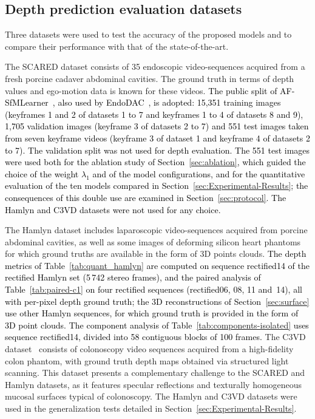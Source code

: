 \documentclass[a4paper,fleqn]{cas-dc}
\begin{document}
{\subsection{Depth prediction evaluation datasets}
Three datasets were used to test the accuracy of the proposed models and to compare their performance with that of the state-of-the-art. 

The SCARED dataset consists of 35 endoscopic video-sequences acquired from a fresh porcine cadaver abdominal cavities. The ground truth in terms of depth values and ego-motion data is known for these videos. \textcolor{black}{The public split of AF-SfMLearner~\citep{Shao_MIA_2022}, also used by EndoDAC~\citep{EndoDAC_MICCAI_2024}, is adopted: 15,351 training images (keyframes 1 and 2 of datasets 1 to 7 and keyframes 1 to 4 of datasets 8 and 9), 1,705 validation images (keyframe 3 of datasets 2 to 7) and 551 test images taken from seven keyframe videos (keyframe 3 of dataset 1 and keyframe 4 of datasets 2 to 7). The validation split was not used for depth evaluation. The 551 test images were used both for the ablation study of Section~\ref{sec:ablation}, which guided the choice of the weight $\lambda_1$ and of the model configurations, and for the quantitative evaluation of the ten models compared in Section~\ref{sec:Experimental-Results}; the consequences of this double use are examined in Section~\ref{sec:protocol}. The Hamlyn and C3VD datasets were not used for any choice.}


The Hamlyn dataset \citep{Recasens_IEEERAL_2021} includes laparoscopic video-sequences acquired from porcine abdominal cavities, as well as some images of deforming silicon heart phantoms for which ground truths are available in the form of 3D points clouds. \textcolor{black}{ The depth metrics of Table~\ref{tab:quant_hamlyn} are computed on sequence rectified14 of the rectified Hamlyn set (5\,742 stereo frames), and the paired analysis of Table~\ref{tab:paired-c1} on four rectified sequences (rectified06, 08, 11 and~14), all with per-pixel depth ground truth; the 3D reconstructions of Section~\ref{sec:surface} use other Hamlyn sequences, for which ground truth is provided in the form of 3D point clouds.} \textcolor{black}{The component analysis of Table~\ref{tab:components-isolated} uses sequence rectified14, divided into 58 contiguous blocks of 100 frames.} The C3VD dataset~\citep{bobrow2023colonoscopy} consists of colonoscopy video sequences acquired from a 
high-fidelity colon phantom, with ground truth depth maps obtained via structured light scanning. This dataset presents a complementary challenge to the SCARED and Hamlyn datasets, as it features specular reflections and texturally homogeneous mucosal surfaces typical of colonoscopy. The Hamlyn and C3VD datasets were used in the generalization tests detailed in 
Section~\ref{sec:Experimental-Results}. 

}
\end{document}
